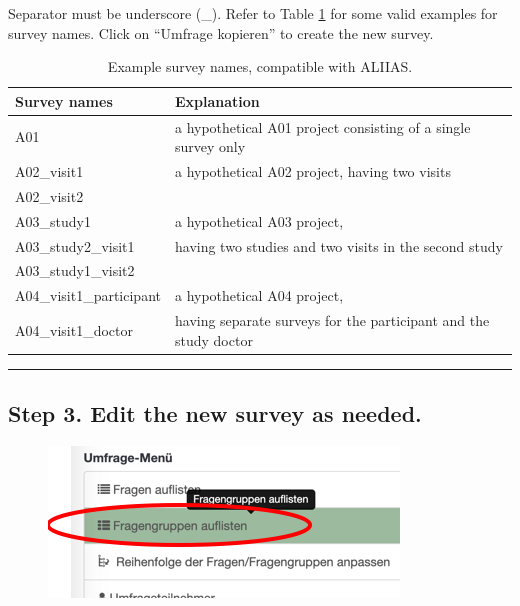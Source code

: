 Separator must be underscore (\_). Refer to Table \ref{tab:example_names} for some valid examples for survey names. Click on “Umfrage kopieren” to create the new survey.
\begin{table}[h]
 \caption{Example survey names, compatible with ALIIAS.}
  \centering
  \begin{tabular}{ll}
    \toprule
    Survey names      & Explanation      \\
    \midrule
    A01            & a hypothetical A01 project consisting of a single survey only                 \\
    \midrule
    A02\_visit1           & a hypothetical A02 project, having two visits \\
    A02\_visit2      & \\
    \midrule
    A03\_study1           & a hypothetical A03 project,               \\
    A03\_study2\_visit1          &  having two studies and two visits in the second study              \\
    A03\_study1\_visit2           &                \\
    \midrule
    A04\_visit1\_participant      &   a hypothetical A04 project,             \\
    A04\_visit1\_doctor           &   having separate surveys for the participant and the study doctor           \\
    \bottomrule
  \end{tabular}
  \label{tab:example_names}
\end{table}

\par\noindent\rule{\textwidth\color{pniblue}}{0.4pt}
\subsection*{Step 3. Edit the new survey as needed. }

\begin{figure}
\centering
\includegraphics{docs/fig/ls_sop3.png}
\end{figure}

